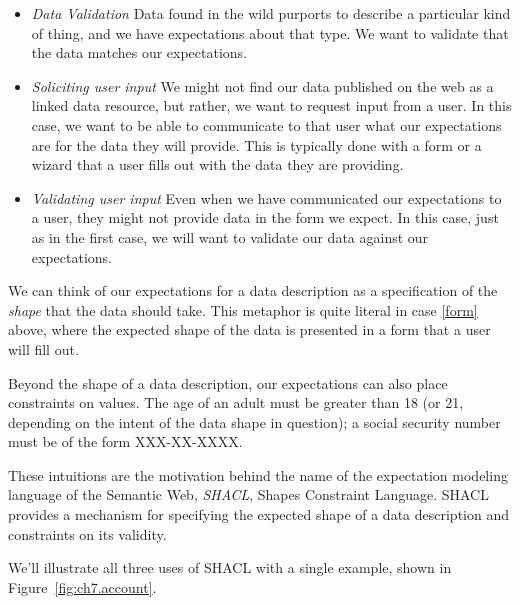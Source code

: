 \begin{itemize}
    \item \emph{Data Validation} \label{datav} Data found in the wild purports to describe a particular kind of thing, and we have
    expectations about that type.  We want to validate that the data matches our expectations.

  \item \emph{Soliciting user input} \label{form}
      We might not find our data published on the web as a linked data resource, but
      rather, we want to request input from a user.  In this case, we want to be able to communicate to that user what
      our expectations are for the data they will provide.  This is typically done with a form or a wizard that a user
      fills out with the data they are providing.

    \item \emph{Validating user input} \label{userv} Even when we have communicated our expectations to a user,
      they might not provide 
      data in the form we expect.  In this case, just as in the first case, we will want to validate our data against our
      expectations.
\end{itemize}

We can think of our expectations for a data description as a specification of the \emph{shape} that the data should take.  This metaphor is quite literal in case \ref{form} above, where the expected shape of the data is presented in a form that a user will fill out.  

Beyond the shape of a data description, our expectations can also place constraints on values.  The age of an adult must be greater than 18 (or 21, depending on the intent of the data shape in question);  a social security number must be of the form XXX-XX-XXXX.

These intuitions are the motivation behind the name of the expectation modeling language of the Semantic Web, \emph{SHACL}, Shapes Constraint Language.  SHACL provides a mechanism for specifying the expected shape of a data description and constraints on its validity.

We'll illustrate all three uses of SHACL with a single example, shown in Figure~\ref{fig:ch7.account}.

